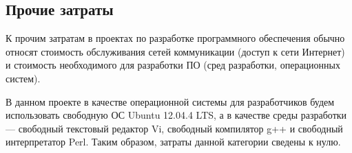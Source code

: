 \subsection{Прочие затраты} \label{other_costs}

К прочим затратам в проектах по разработке программного обеспечения обычно относят стоимость обслуживания сетей коммуникации (доступ к сети Интернет) и стоимость необходимого для разработки ПО (сред разработки, операционных систем).

\vspace{\baselineskip}
В данном проекте в качестве операционной системы для разработчиков будем использовать свободную ОС Ubuntu 12.04.4 LTS, а в качестве среды разработки --- свободный текстовый редактор Vi, свободный компилятор g++ и свободный интерпретатор Perl. Таким образом, затраты данной категории сведены к нулю.